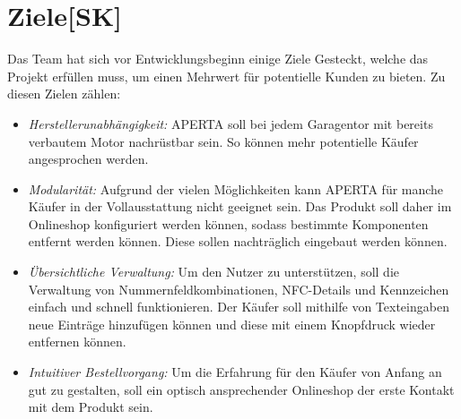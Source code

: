 \section{Ziele[SK]}
Das Team hat sich vor Entwicklungsbeginn einige Ziele Gesteckt, welche das Projekt erfüllen muss, um einen Mehrwert für potentielle Kunden zu bieten. Zu diesen Zielen zählen:
\begin{itemize}
    \item \textit{Herstellerunabhängigkeit:} APERTA soll bei jedem Garagentor mit bereits verbautem Motor nachrüstbar sein. So können mehr potentielle Käufer angesprochen werden.
    \item \textit{Modularität:} Aufgrund der vielen Möglichkeiten kann APERTA für manche Käufer in der Vollausstattung nicht geeignet sein. Das Produkt soll daher im Onlineshop konfiguriert werden können, sodass bestimmte Komponenten entfernt werden können. Diese sollen nachträglich eingebaut werden können.
    \item \textit{Übersichtliche Verwaltung:} Um den Nutzer zu unterstützen, soll die Verwaltung von Nummernfeldkombinationen, NFC-Details und Kennzeichen einfach und schnell funktionieren. Der Käufer soll mithilfe von Texteingaben neue Einträge hinzufügen können und diese mit einem Knopfdruck wieder entfernen können.
    \item \textit{Intuitiver Bestellvorgang:}
    Um die Erfahrung für den Käufer von Anfang an gut zu gestalten, soll ein optisch ansprechender Onlineshop der erste Kontakt mit dem Produkt sein.
  \end{itemize}